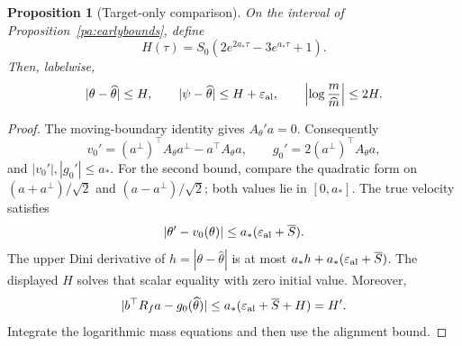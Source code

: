 \documentclass[11pt]{article}
\numberwithin{equation}{section}
\newtheorem{proposition}{Proposition}[section]
\theoremstyle{definition}
\theoremstyle{remark}
\newcommand{\1}{\mathbf 1}
\begin{document}
\begin{proposition}[Target-only comparison]\label{pa:targetcomparison}
On the interval of Proposition~\ref{pa:earlybounds}, define
\[
 H(\tau)=S_0(2e^{2a_*\tau}-3e^{a_*\tau}+1).
\]
Then, labelwise,
\[
 |\theta-\widehat\theta|\le H,\qquad
 |\psi-\widehat\theta|\le H+\varepsilon_{\rm al},\qquad
 \left|\log\frac m{\widehat m}\right|\le2H.
\]
\end{proposition}
\begin{proof}
The moving-boundary identity gives $A_\theta'a=0$. Consequently
\[
 v_0'=(a^\perp)^\top A_\theta a^\perp-a^\top A_\theta a,
 \qquad g_0'=2(a^\perp)^\top A_\theta a,
\]
and $|v_0'|,|g_0'|\le a_*$. For the second bound, compare the quadratic form
on $(a+a^\perp)/\sqrt2$ and $(a-a^\perp)/\sqrt2$; both values lie in
$[0,a_*]$. The true velocity satisfies
\[
 |\theta'-v_0(\theta)|\le a_*(\varepsilon_{\rm al}+\overline S).
\]
The upper Dini derivative of $h=|\theta-\widehat\theta|$ is at most
$a_*h+a_*(\varepsilon_{\rm al}+\overline S)$. The displayed $H$ solves that
scalar equality with zero initial value. Moreover,
\[
 |b^\top R_fa-g_0(\widehat\theta)|
 \le a_*(\varepsilon_{\rm al}+\overline S+H)=H'.
\]
Integrate the logarithmic mass equations and then use the alignment bound.
\end{proof}
\end{document}
